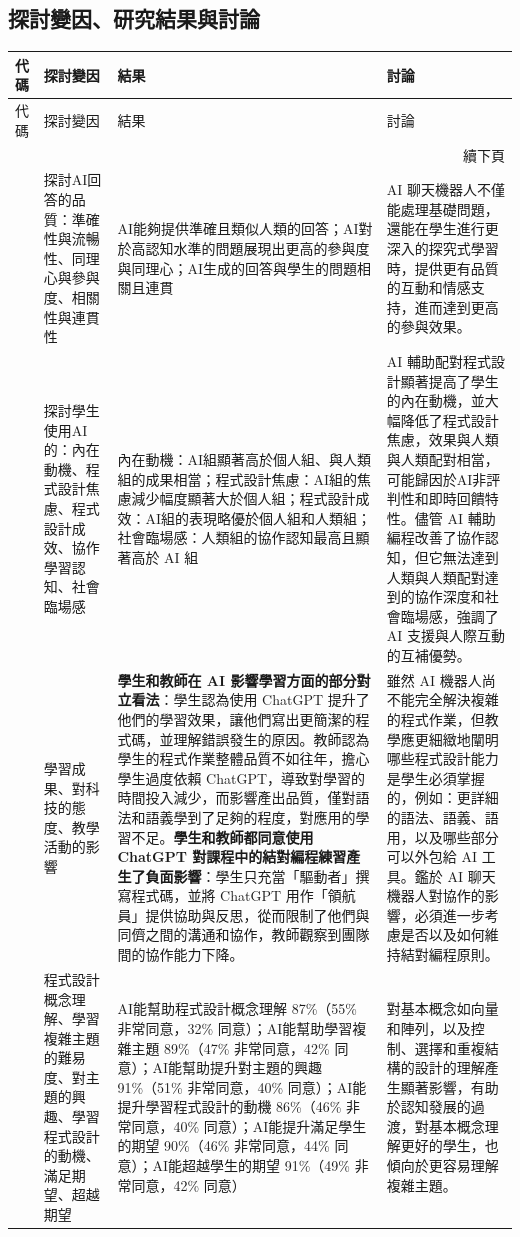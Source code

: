 \subsection{探討變因、研究結果與討論}\label{sec:探討變因}

\begin{longtable}{p{} p{} p{} p{}}
\toprule
代碼 & 探討變因 & 結果 & 討論 \\
\midrule
\endfirsthead
\toprule
代碼 & 探討變因 & 結果 & 討論 \\
\midrule
\endhead
\midrule
\multicolumn{4}{r}{續下頁} \\
\endfoot
\bottomrule
\endlastfoot
\cite{cao2023chatbots} & 探討AI回答的品質：準確性與流暢性、同理心與參與度、相關性與連貫性 & AI能夠提供準確且類似人類的回答；AI對於高認知水準的問題展現出更高的參與度與同理心；AI生成的回答與學生的問題相關且連貫 & AI 聊天機器人不僅能處理基礎問題，還能在學生進行更深入的探究式學習時，提供更有品質的互動和情感支持，進而達到更高的參與效果。 \\
\cite{fan2025pair} & 探討學生使用AI的：內在動機、程式設計焦慮、程式設計成效、協作學習認知、社會臨場感 & 內在動機：AI組顯著高於個人組、與人類組的成果相當；程式設計焦慮：AI組的焦慮減少幅度顯著大於個人組；程式設計成效：AI組的表現略優於個人組和人類組；社會臨場感：人類組的協作認知最高且顯著高於 AI 組 & AI 輔助配對程式設計顯著提高了學生的內在動機，並大幅降低了程式設計焦慮，效果與人類與人類配對相當，可能歸因於AI非評判性和即時回饋特性。儘管 AI 輔助編程改善了協作認知，但它無法達到人類與人類配對達到的協作深度和社會臨場感，強調了 AI 支援與人際互動的互補優勢。 \\
\cite{groothuijsen2024chatbots} & 學習成果、對科技的態度、教學活動的影響 & \textbf{學生和教師在 AI 影響學習方面的部分對立看法}：學生認為使用 ChatGPT 提升了他們的學習效果，讓他們寫出更簡潔的程式碼，並理解錯誤發生的原因。教師認為學生的程式作業整體品質不如往年，擔心學生過度依賴 ChatGPT，導致對學習的時間投入減少，而影響產出品質，僅對語法和語義學到了足夠的程度，對應用的學習不足。\textbf{學生和教師都同意使用 ChatGPT 對課程中的結對編程練習產生了負面影響}：學生只充當「驅動者」撰寫程式碼，並將 ChatGPT 用作「領航員」提供協助與反思，從而限制了他們與同儕之間的溝通和協作，教師觀察到團隊間的協作能力下降。 & 雖然 AI 機器人尚不能完全解決複雜的程式作業，但教學應更細緻地闡明哪些程式設計能力是學生必須掌握的，例如：更詳細的語法、語義、語用，以及哪些部分可以外包給 AI 工具。鑑於 AI 聊天機器人對協作的影響，必須進一步考慮是否以及如何維持結對編程原則。 \\
\cite{llerena2024introductory} & 程式設計概念理解、學習複雜主題的難易度、對主題的興趣、學習程式設計的動機、滿足期望、超越期望 & AI能幫助程式設計概念理解 87\%（55\% 非常同意，32\% 同意）；AI能幫助學習複雜主題 89\%（47\% 非常同意，42\% 同意）；AI能幫助提升對主題的興趣 91\%（51\% 非常同意，40\% 同意）；AI能提升學習程式設計的動機 86\%（46\% 非常同意，40\% 同意）；AI能提升滿足學生的期望 90\%（46\% 非常同意，44\% 同意）；AI能超越學生的期望 91\%（49\% 非常同意，42\% 同意） & 對基本概念如向量和陣列，以及控制、選擇和重複結構的設計的理解產生顯著影響，有助於認知發展的過渡，對基本概念理解更好的學生，也傾向於更容易理解複雜主題。 \\

\end{longtable}
